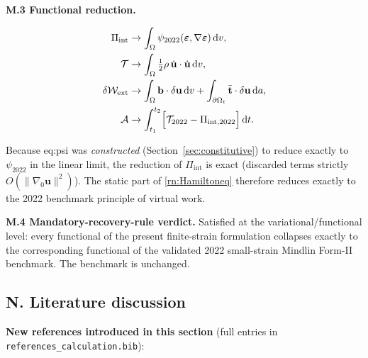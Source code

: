 \documentclass[11pt]{article}
\begin{document}
\textbf{M.3 Functional reduction.}

\begin{align}
\Pi_{\mathrm{int}} &\to \int_{\Omega}\psi_{2022}(\boldsymbol{\varepsilon},\nabla\boldsymbol{\varepsilon})\,\mathrm{d}v,
\label{rn:rec_Pi}\\
\mathcal{T} &\to \int_{\Omega}\tfrac12\rho\,\dot{\mathbf{u}}\cdot\dot{\mathbf{u}}\,\mathrm{d}v,
\label{rn:rec_T}\\
\delta\mathcal{W}_{\mathrm{ext}} &\to \int_{\Omega}\mathbf{b}\cdot\delta\mathbf{u}\,\mathrm{d}v
                                  + \int_{\partial\Omega_{t}}\bar{\mathbf{t}}\cdot\delta\mathbf{u}\,\mathrm{d}a,
\label{rn:rec_Wext}\\
\mathcal{A} &\to \int_{t_{1}}^{t_{2}}\Bigl[\mathcal{T}_{2022}-\Pi_{\mathrm{int},2022}\Bigr]\,\mathrm{d}t.
\label{rn:rec_A}
\end{align}

Because eq:psi was \emph{constructed} (Section~\ref{sec:constitutive}) to reduce exactly to $\psi_{2022}$ in the linear limit, the reduction of $\Pi_{\mathrm{int}}$ is exact (discarded terms strictly $O(\|\nabla_{0}\mathbf{u}\|^{2})$). The static part of \eqref{rn:Hamiltoneq} therefore reduces exactly to the 2022 benchmark principle of virtual work.

\textbf{M.4 Mandatory-recovery-rule verdict.} \checkmark Satisfied at the variational/functional level: every functional of the present finite-strain formulation collapses exactly to the corresponding functional of the validated 2022 small-strain Mindlin Form-II benchmark. The benchmark is unchanged.

\subsection{N. Literature discussion}

\textbf{New references introduced in this section} (full entries in \texttt{references\_calculation.bib}):
\end{document}
